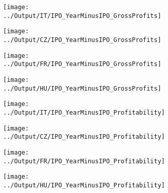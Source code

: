 \documentclass[12pt,notitlepage]{article}
\begin{document}
\begin{figure}[!htpb]
\centering
\caption{IPO and Gross Profits}
\begin{subfigure}{.49\textwidth}
    \centering
 \texttt{[image: ../Output/IT/IPO\_YearMinusIPO\_GrossProfits]}
\end{subfigure}%
\begin{subfigure}{.49\textwidth}
    \centering
 \texttt{[image: ../Output/CZ/IPO\_YearMinusIPO\_GrossProfits]}
\end{subfigure}
\begin{subfigure}{.49\textwidth}
    \centering
 \texttt{[image: ../Output/FR/IPO\_YearMinusIPO\_GrossProfits]}
\end{subfigure}%
\begin{subfigure}{.49\textwidth}
    \centering
 \texttt{[image: ../Output/HU/IPO\_YearMinusIPO\_GrossProfits]}
\end{subfigure}
\end{figure}
\pagebreak

\begin{figure}[!htpb]
\centering
\caption{IPO and Profitability}
\begin{subfigure}{.49\textwidth}
    \centering
 \texttt{[image: ../Output/IT/IPO\_YearMinusIPO\_Profitability]}
\end{subfigure}%
\begin{subfigure}{.49\textwidth}
    \centering
 \texttt{[image: ../Output/CZ/IPO\_YearMinusIPO\_Profitability]}
\end{subfigure}
\begin{subfigure}{.49\textwidth}
    \centering
 \texttt{[image: ../Output/FR/IPO\_YearMinusIPO\_Profitability]}
\end{subfigure}%
\begin{subfigure}{.49\textwidth}
    \centering
 \texttt{[image: ../Output/HU/IPO\_YearMinusIPO\_Profitability]}
\end{subfigure}
\end{figure}
\pagebreak
\end{document}
